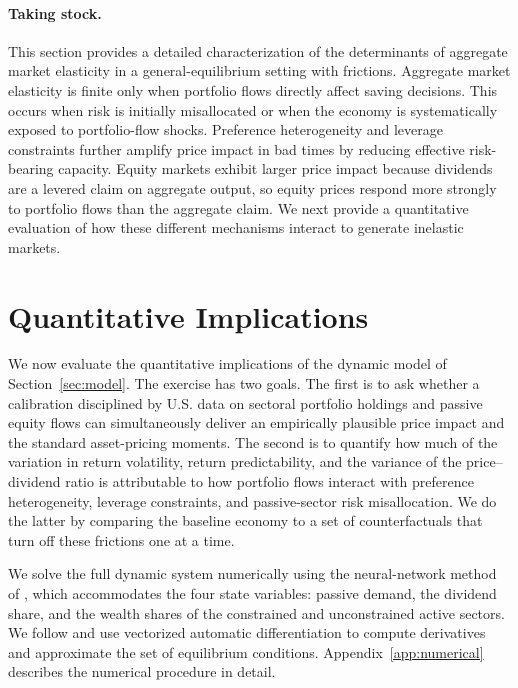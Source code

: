 \documentclass[12pt,english]{article}
\begin{document}
\paragraph{Taking stock.}
This section provides a detailed characterization of the determinants of aggregate market elasticity in a general-equilibrium setting with frictions.
Aggregate market elasticity is finite only when portfolio flows directly affect saving decisions.
This occurs when risk is initially misallocated or when the economy is systematically exposed to portfolio-flow shocks.
Preference heterogeneity and leverage constraints further amplify price impact in bad times by reducing effective risk-bearing capacity.
Equity markets exhibit larger price impact because dividends are a levered claim on aggregate output, so equity prices respond more strongly to portfolio flows than the aggregate claim.
We next provide a quantitative evaluation of how these different mechanisms interact to generate inelastic markets.

\section{Quantitative Implications}\label{sec:quantitative}

We now evaluate the quantitative implications of the dynamic model of Section~\ref{sec:model}.
The exercise has two goals.
The first is to ask whether a calibration disciplined by U.S. data on sectoral portfolio holdings and passive equity flows can simultaneously deliver an empirically plausible price impact and the standard asset-pricing moments.
The second is to quantify how much of the variation in return volatility, return predictability, and the variance of the price--dividend ratio is attributable to how portfolio flows interact with preference heterogeneity, leverage constraints, and passive-sector risk misallocation.
We do the latter by comparing the baseline economy to a set of counterfactuals that turn off these frictions one at a time.

We solve the full dynamic system numerically using the neural-network method of \citet{duarte2024machine}, which accommodates the four state variables: passive demand, the dividend share, and the wealth shares of the constrained and unconstrained active sectors. We follow \cite{Gopalakrishna2026} and use vectorized automatic differentiation to compute derivatives and approximate the set of equilibrium conditions.
Appendix~\ref{app:numerical} describes the numerical procedure in detail.
\end{document}
